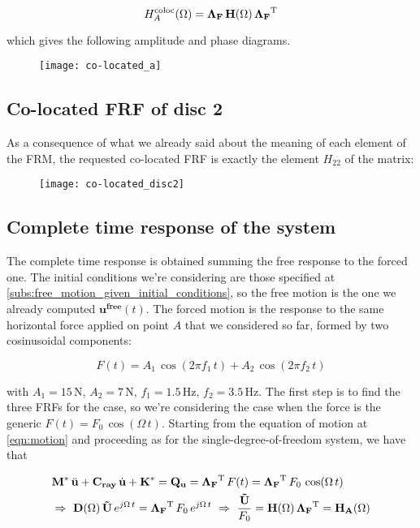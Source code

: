 \documentclass[a4paper,12pt,oneside]{article}
\begin{document}
\[
	H^\textup{coloc}_A(\Omega) =
		\mathbf{\Lambda_F} \, \mathbf{H}(\Omega) \, \mathbf{\Lambda_F}^\textup{T}
\]

which gives the following amplitude and phase diagrams.

\begin{figure}[H]
	\hspace{-70pt}
	\texttt{[image: co-located\_a]}
\end{figure}

\subsection{Co-located FRF of disc 2}

As a consequence of what we already said about the meaning of each element of the FRM, the requested co-located FRF is exactly the element $ H_{22} $ of the matrix:

\begin{figure}[h]
	\hspace{-70pt}
	\texttt{[image: co-located\_disc2]}
\end{figure}

\subsection{Complete time response of the system}

The complete time response is obtained summing the free response to the forced one. The initial conditions we're considering are those specified at \ref{subs:free_motion_given_initial_conditions}, so the free motion is the one we already computed $ \mathbf{u^{free}}(t) $. The forced motion is the response to the same horizontal force applied on point $ A $ that we considered so far, formed by two cosinusoidal components:

\[ F(t) = A_1 \, \cos(2 \pi f_1 \, t) + A_2 \, \cos(2 \pi f_2 \, t) \]

with $ A_1 = 15 \, \text{N} $, $ A_2 = 7 \, \text{N} $, $ f_1 = 1.5 \, \text{Hz} $, $ f_2 = 3.5 \, \text{Hz} $. The first step is to find the three FRFs for the case, so we're considering the case when the force is the generic $ F(t) = F_0 \, \cos(\Omega \, t) $. Starting from the equation of motion at \ref{eqn:motion} and proceeding as for the single-degree-of-freedom system, we have that

\[ \begin{split}
	& \mathbf{M^*} \, \ddot{\mathbf{u}} + \mathbf{C_{ray}} \, \dot{\mathbf{u}} +
		\mathbf{K^*} = \mathbf{Q_{u}} = \mathbf{\Lambda_F}^\textup{T} \, F(t) =
		\mathbf{\Lambda_F}^\textup{T} \, F_0 \, \cos(\Omega \, t) \\
	& \Rightarrow ~ \mathbf{D}(\Omega) \, \mathbf{\tilde{U}} \, e^{j \Omega \, t} =
		\mathbf{\Lambda_F}^\textup{T} \, F_0 \, e^{j \Omega \, t} ~ \Rightarrow ~
		\frac{\mathbf{\tilde{U}}}{F_0} =
		\mathbf{H}(\Omega) \, \mathbf{\Lambda_F}^\textup{T} =
		\mathbf{H_A}(\Omega)
\end{split} \]
\end{document}
